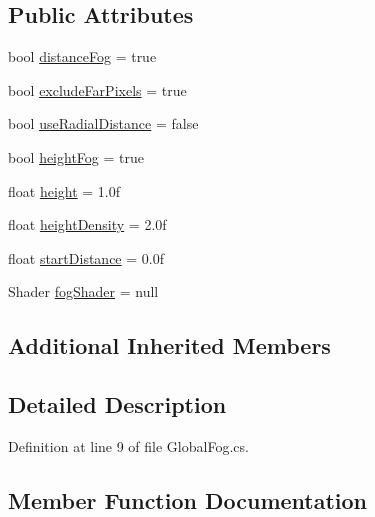 \subsection*{Public Attributes}
\begin{DoxyCompactItemize}
\item 
bool \mbox{\hyperlink{class_unity_standard_assets_1_1_image_effects_1_1_global_fog_abe3e7fb05ef9010259205cb8a09bdb07}{distance\+Fog}} = true
\item 
bool \mbox{\hyperlink{class_unity_standard_assets_1_1_image_effects_1_1_global_fog_af0521e46344eb4bc774cd5900cc42598}{exclude\+Far\+Pixels}} = true
\item 
bool \mbox{\hyperlink{class_unity_standard_assets_1_1_image_effects_1_1_global_fog_a70d130c927f76c6c0410434fe379b66b}{use\+Radial\+Distance}} = false
\item 
bool \mbox{\hyperlink{class_unity_standard_assets_1_1_image_effects_1_1_global_fog_af048a9bd0d4b04166191fc5e568d86c3}{height\+Fog}} = true
\item 
float \mbox{\hyperlink{class_unity_standard_assets_1_1_image_effects_1_1_global_fog_a45c1ab2e1c8fa44061efbe0dd08e68de}{height}} = 1.\+0f
\item 
float \mbox{\hyperlink{class_unity_standard_assets_1_1_image_effects_1_1_global_fog_af8965d759e6abdd6ec766a043e5fef96}{height\+Density}} = 2.\+0f
\item 
float \mbox{\hyperlink{class_unity_standard_assets_1_1_image_effects_1_1_global_fog_af2ea7bae200d166b920f2dee058f77e5}{start\+Distance}} = 0.\+0f
\item 
Shader \mbox{\hyperlink{class_unity_standard_assets_1_1_image_effects_1_1_global_fog_a1f8a0b743aa99208a0c8c6019b1ed4e2}{fog\+Shader}} = null
\end{DoxyCompactItemize}
\subsection*{Additional Inherited Members}


\subsection{Detailed Description}


Definition at line 9 of file Global\+Fog.\+cs.



\subsection{Member Function Documentation}
\mbox{\label{class_unity_standard_assets_1_1_image_effects_1_1_global_fog_af644a7d78d3aef80dbc6faa274051776}} 
